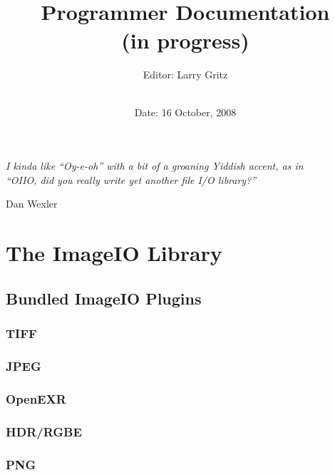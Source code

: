 \documentclass[11pt,letterpaper]{book}
\title{ 
{\Huge{\bf \product}
{\bf\sffamily \versionnumber} \medskip \\ \huge Programmer Documentation
\\ \large (in progress) 
} \bigskip }
\author{Editor: Larry Gritz \\
 \bigskip \\
}
\date{{\large 
Date: 16 October, 2008
}}
\begin{document}
\frontmatter

\maketitle

%

\vspace*{2in}

\begin{centering}
\emph{I kinda like ``Oy-e-oh'' with a bit of a groaning Yiddish accent, as in\\
``OIIO, did you really write yet another file I/O library?''} \\
\end{centering}
\medskip
\begin{centering}
\center Dan Wexler \\
\end{centering}




\setcounter{tocdepth}{1}
\tableofcontents

\mainmatter



\part{The ImageIO Library}







\chapter{Bundled ImageIO Plugins}
\section{TIFF}
\section{JPEG}
\section{OpenEXR}
\section{HDR/RGBE}
\section{PNG}
\end{document}
